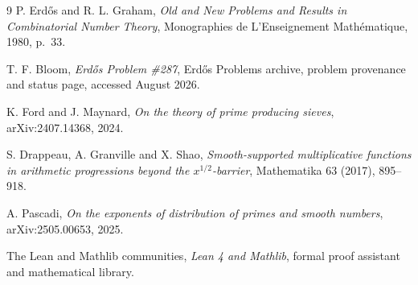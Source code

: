 \documentclass[11pt]{article}
\theoremstyle{definition}
\newcommand{\1}{\mathbf 1}
\begin{document}
\begin{thebibliography}{9}
P. Erd\H{o}s and R. L. Graham,
\emph{Old and New Problems and Results in Combinatorial Number Theory},
Monographies de L'Enseignement Math\'ematique, 1980, p.~33.

T. F. Bloom,
\emph{Erd\H{o}s Problem \#287}, Erd\H{o}s Problems archive,
problem provenance and status page, accessed August 2026.

K. Ford and J. Maynard,
\emph{On the theory of prime producing sieves},
arXiv:2407.14368, 2024.

S. Drappeau, A. Granville and X. Shao,
\emph{Smooth-supported multiplicative functions in arithmetic progressions beyond the
$x^{1/2}$-barrier}, Mathematika 63 (2017), 895--918.

A. Pascadi,
\emph{On the exponents of distribution of primes and smooth numbers},
arXiv:2505.00653, 2025.

The Lean and Mathlib communities,
\emph{Lean 4 and Mathlib}, formal proof assistant and mathematical library.
\end{thebibliography}
\end{document}
